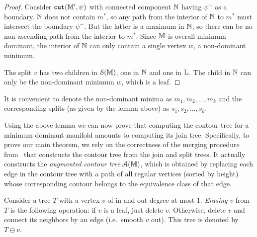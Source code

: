{\begin{proof}
Consider ${\tt cut}(\mathbb{M}',\psi)$ with connected component $\mathbb{N}$ having $\psi^-$ as a boundary. $\mathbb{N}$
does not contain $m^*$, so any path from the interior of $\mathbb{N}$ to $m^*$ must intersect the boundary $\psi^-$.
But the latter is a maximum in $\mathbb{N}$, so there can be no non-ascending path from the interior to $m^*$.
Since $\mathbb{M}$ is overall minimum dominant, the interior of $\mathbb{N}$ can only contain a single vertex $w$, a non-dominant
minimum.

The split $v$ has two children in ${\cal S}(\mathbb{M})$, one in $\mathbb{N}$ and one in $\mathbb{L}$. The child in $\mathbb{N}$ can only
be the non-dominant minimum $w$, which is a leaf. 
\end{proof}

It is convenient to denote the non-dominant minima as $m_1, m_2, \ldots, m_k$
and the corresponding splits (as given by the lemma above) as $s_1, s_2, \ldots, s_k$. 

Using the above lemma we can now prove that computing the contour tree for a minimum dominant manifold 
amounts to computing its join tree.  Specifically, to prove our main theorem, we rely on the correctness of the
merging procedure from~\cite{csa-cctad-00} that constructs the contour tree from the join and split trees. 
It actually constructs the \emph{augmented contour tree} ${\cal A}(\mathbb{M})$, which is 
obtained by replacing each edge in the contour tree with a path of all regular vertices 
(sorted by height) whose corresponding contour belongs to the equivalence class of that edge.

Consider a tree $T$ with a vertex $v$ of in and out degree at most $1$.
\emph{Erasing} $v$ from $T$ is the following operation: if $v$ is a leaf, just delete $v$. Otherwise, 
delete $v$ and connect its neighbors by an edge (i.e.\ smooth $v$ out). This tree is denoted by $T \ominus v$.


\medskip
{}

\medskip
}

